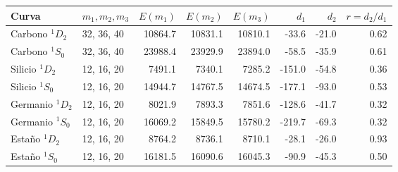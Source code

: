\begin{tabular}{llrrrrrr}
    \toprule
    Curva & $m_1, m_2, m_3$ & $E(m_1)$ & $E(m_2)$ & $E(m_3)$ & $d_1$ & $d_2$ & $r = d_2/d_1$ \\
    \midrule
    Carbono $^1D_2$ & 32, 36, 40 & 10864.7 & 10831.1 & 10810.1 & -33.6 & -21.0 & 0.62 \\
    Carbono $^1S_0$ & 32, 36, 40 & 23988.4 & 23929.9 & 23894.0 & -58.5 & -35.9 & 0.61 \\
    Silicio $^1D_2$ & 12, 16, 20 & 7491.1 & 7340.1 & 7285.2 & -151.0 & -54.8 & 0.36 \\
    Silicio $^1S_0$ & 12, 16, 20 & 14944.7 & 14767.5 & 14674.5 & -177.1 & -93.0 & 0.53 \\
    Germanio $^1D_2$ & 12, 16, 20 & 8021.9 & 7893.3 & 7851.6 & -128.6 & -41.7 & 0.32 \\
    Germanio $^1S_0$ & 12, 16, 20 & 16069.2 & 15849.5 & 15780.2 & -219.7 & -69.3 & 0.32 \\
    Estaño $^1D_2$ & 12, 16, 20 & 8764.2 & 8736.1 & 8710.1 & -28.1 & -26.0 & 0.93 \\
    Estaño $^1S_0$ & 12, 16, 20 & 16181.5 & 16090.6 & 16045.3 & -90.9 & -45.3 & 0.50 \\
    \bottomrule
\end{tabular}
